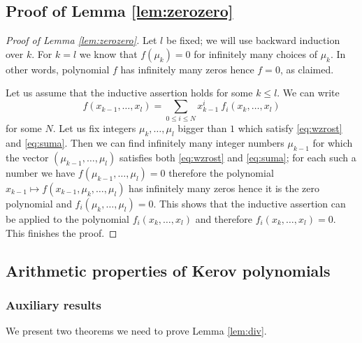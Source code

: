 \documentclass[12pt]{amsart}
\theoremstyle{plain}
\newtheorem{lemma}{Lemma}[section]
\theoremstyle{remark}
\begin{document}

\subsection{Proof of Lemma \ref{lem:zerozero}}
\begin{proof}[Proof of Lemma \ref{lem:zerozero}]
Let $l$ be fixed; we will use backward induction over $k$. For $k=l$
we know that $f(\mu_k)=0$ for infinitely many choices of $\mu_k$. In other
words, polynomial $f$ has infinitely many zeros hence $f=0$, as claimed.

Let us assume that the inductive assertion holds for some $k\leq l$.
We can write
$$f(x_{k-1}, \dots, x_{l})
= \sum_{0 \leq i \leq N} x_{k-1}^{i}\ f_i(x_k, \dots, x_{l})$$
for some $N$. Let us fix integers $\mu_{k}, \dots, \mu_{l}$ bigger than $1$
which satisfy
\eqref{eq:wzrost} and \eqref{eq:suma}. Then we can find infinitely many
integer
numbers $\mu_{k-1}$ for which the vector $(\mu_{k-1},\dots,\mu_{l})$
satisfies both \eqref{eq:wzrost} and \eqref{eq:suma}; for each such a number we
have
$f(\mu_{k-1}, \dots, \mu_{l}) = 0$ therefore the polynomial $x_{k-1}\mapsto
f(x_{k-1},\mu_{k},\dots,\mu_{l})$ has infinitely many zeros hence it is the
zero polynomial and 
$f_i(\mu_{k}, \dots, \mu_{l})=0$. This shows that the inductive assertion
can be applied to the polynomial $f_i(x_{k},\dots,x_{l})$ and therefore
$f_i(x_{k},\dots,x_{l})=0$. This finishes the proof.
\end{proof}


\subsection{Arithmetic properties of Kerov polynomials}

\subsubsection{Auxiliary results}

We present two theorems we need to prove Lemma \ref{lem:div}.
\end{document}
